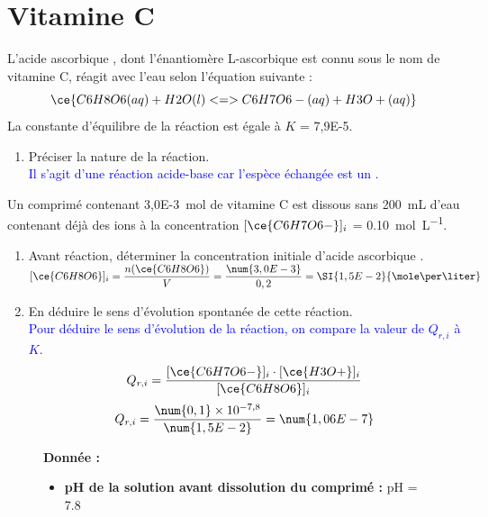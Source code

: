 \documentclass[a4paper,11pt,fleqn]{article}%
\begin{document}
\section{Vitamine C}
L'acide ascorbique , dont l'énantiomère L-ascorbique est connu sous le nom de vitamine C, réagit avec l'eau selon l'équation suivante :
$$\ce{C6H8O6(aq) + H2O(l) <=> C6H7O6-(aq) + H3O+(aq)}$$
La constante d'équilibre de la réaction est égale à $K$ = \num{7,9E-5}.

\begin{enumerate}
    \item Préciser la nature de la réaction.\\
    \textcolor{blue}{Il s'agit d'une réaction acide-base car l'espèce échangée est un .}
\end{enumerate}
Un comprimé contenant \SI{3,0E-3}{\mole} de vitamine C est dissous sans \SI{200}{\milli\liter} d'eau contenant déjà des ions  à la concentration $[\ce{C6H7O6-}]_i$ = \SI{0,10}{\mole\per\liter}.
\begin{enumerate}[resume]
    \item Avant réaction, déterminer la concentration initiale d'acide ascorbique .\\
    \textcolor{blue}{$[\ce{C6H8O6}]_i = \dfrac{n(\ce{C6H8O6})}{V} = \dfrac{\num{3,0E-3}}{0,2} = \SI{1,5E-2}{\mole\per\liter}$}
    \item En déduire le sens d'évolution spontanée de cette réaction.\\
    \textcolor{blue}{Pour déduire le sens d'évolution de la réaction, on compare la valeur de $Q_{r,i}$ à $K$.
    $$Q_{r,i} = \dfrac{[\ce{C6H7O6-}]_i \cdot [\ce{H3O+}]_i}{[\ce{C6H8O6}]_i}$$
    $$Q_{r,i} = \dfrac{\num{0,1} \times 10^{-7,8}}{\num{1,5E-2}}= \num{1,06E-7}$$}
\end{enumerate}
\begin{figure}[H]
    \begin{minipage}{\linewidth}
    \textbf{Donnée :}
    \begin{itemize}
        \item \textbf{pH de la solution avant dissolution du comprimé :} pH = \num{7,8}
    \end{itemize}
    \end{minipage}
\end{figure}
\end{document}
